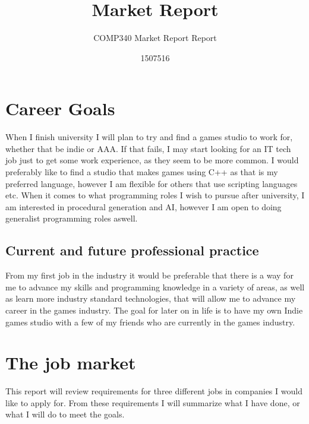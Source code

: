 \documentclass{scrartcl}
\title{Market Report}
\subtitle{COMP340 Market Report Report}
\author{1507516}
\begin{document}
\maketitle


\section{Career Goals}

When I finish university I will plan to try and find a games studio to work for, whether that be indie or AAA. If that fails, I may start looking for an IT tech job just to get some work experience, as they seem to be more common.
I would preferably like to find a studio that makes games using C++ as that is my preferred language, however I am flexible for others that use scripting languages etc.
When it comes to what programming roles I wish to pursue after university, I am interested in procedural generation and AI, however I am open to doing generalist programming roles aswell.


\subsection{Current and future professional practice}
From my first job in the industry it would be preferable that there is a way for me to advance my skills and programming knowledge in a variety of areas, as well as learn more industry standard technologies, that will allow me to advance my career in the games industry. The goal for later on in life is to have my own Indie games studio with a few of my friends who are currently in the games industry.

\subsection{}

\section{The job market}
This report will review requirements for three different jobs in companies I would like to apply for. From these requirements I will summarize what I have done, or what I will do to meet the goals. 
\end{document}
